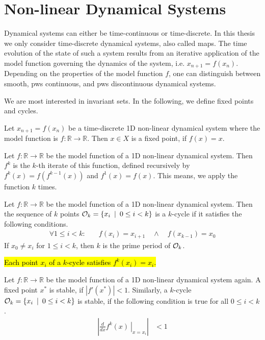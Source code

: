 \section{Non-linear Dynamical Systems}

Dynamical systems can either be time-continuous or time-discrete.
In this thesis we only consider time-discrete dynamical systems, also called maps.
The time evolution of the state of such a system results from an iterative application of the model function governing the dynamics of the system, i.e. $x_{n+1} = f(x_n)$.
Depending on the properties of the model function $f$, one can distinguish between smooth, \gls{pws} continuous, and \gls{pws} discontinuous dynamical systems.

We are most interested in invariant sets.
In the following, we define fixed points and cycles.

\begin{definition}
	Let $x_{n+1} = f(x_n)$ be a time-discrete 1D non-linear dynamical system where the model function is $f: \mathbb{R} \to \mathbb{R}$.
	Then $x \in X$ is a fixed point, if $f(x) = x$.
\end{definition}

\begin{definition}
	Let $f: \mathbb{R} \to \mathbb{R}$ be the model function of a 1D non-linear dynamical system.
	Then $f^k$ is the $k$-th iterate of this function, defined recursively by $f^k(x) = f\left(f^{k-1}(x)\right)$ and $f^1(x) = f(x)$.
	This means, we apply the function $k$ times.
\end{definition}

\begin{definition}[Cycle]
	Let $f: \mathbb{R} \to \mathbb{R}$ be the model function of a 1D non-linear dynamical system.
	Then the sequence of $k$ points $\mathcal{O}_k = \{x_i \:\mid\: 0 \leq i < k\}$ is a $k$-cycle if it satisfies the following conditions.
	\begin{align}
		\forall 1 \leq i < k: \quad & f(x_i) = x_{i+1} \quad \land \quad f(x_{k-1}) = x_0
	\end{align}
	If $x_0 \neq x_i$ for $1 \leq i < k$, then $k$ is the prime period of $\mathcal{O}_k$.
\end{definition}

\hl{
	Each point $x_i$ of a $k$-cycle satisfies $f^k(x_i) = x_i$.
}

\begin{definition}[Stability]
	Let $f: \mathbb{R} \to \mathbb{R}$ be the model function of a 1D non-linear dynamical system again.
	A fixed point $x^*$ is stable, if $|f'(x^*)| < 1$.
	Similarly, a $k$-cycle $\mathcal{O}_k = \{x_i \:\mid\: 0 \leq i < k\}$ is stable, if the following condition is true for all $0 \leq i < k$.
	\begin{align}
		\left| \left. \frac{d}{dx}f^k(x) \:\right|_{x = x_i}\right| & < 1
	\end{align}
\end{definition}

